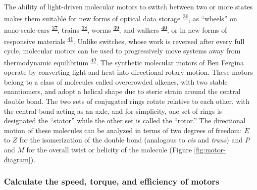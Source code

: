 \documentclass[11pt,notitlepage]{article}
\providecommand{\DIFaddbegin}{} %
\providecommand{\DIFaddend}{} %
\providecommand{\DIFdelbegin}{} %
\providecommand{\DIFdelend}{} %
\newcommand{\DIFscaledelfig}{0.5}
\newlength{\DIFdelgraphicswidth} %
\newlength{\DIFdelgraphicsheight} %
\newcommand{\DIFaddincludegraphics}[2][]{{\color{blue}\fbox{\DIFOincludegraphics[#1]{#2}}}} %
\newcommand{\DIFdelincludegraphics}[2][]{%
\sbox{\DIFdelgraphicsbox}{\DIFOincludegraphics[#1]{#2}}%
\settoboxwidth{\DIFdelgraphicswidth}{\DIFdelgraphicsbox} %
\settoboxtotalheight{\DIFdelgraphicsheight}{\DIFdelgraphicsbox} %
\scalebox{\DIFscaledelfig}{%
\parbox[b]{\DIFdelgraphicswidth}{\usebox{\DIFdelgraphicsbox}\\[-\baselineskip] \rule{\DIFdelgraphicswidth}{0em}}\llap{\resizebox{\DIFdelgraphicswidth}{\DIFdelgraphicsheight}{%
\setlength{\unitlength}{\DIFdelgraphicswidth}%
\begin{picture}(1,1)%
\thicklines\linethickness{2pt} %
{\color[rgb]{1,0,0}\put(0,0){\framebox(1,1){}}}%
{\color[rgb]{1,0,0}\put(0,0){\line( 1,1){1}}}%
{\color[rgb]{1,0,0}\put(0,1){\line(1,-1){1}}}%
\end{picture}%
}\hspace*{3pt}}} %
} %
\DeclareRobustCommand{\DIFaddbegin}{\DIFOaddbegin \let\includegraphics\DIFaddincludegraphics} %
\DeclareRobustCommand{\DIFaddend}{\DIFOaddend \let\includegraphics\DIFOincludegraphics} %
\DeclareRobustCommand{\DIFdelbegin}{\DIFOdelbegin \let\includegraphics\DIFdelincludegraphics} %
\DeclareRobustCommand{\DIFdelend}{\DIFOaddend \let\includegraphics\DIFOincludegraphics} %
\begin{document}
The ability of light-driven molecular motors to switch between two or
more states makes them suitable for new forms of optical data
storage\textsuperscript{\protect\DIFdelbegin %
\DIFdelend \DIFaddbegin \hyperlink{ref-18PGyWtWV}{36}\DIFaddend }, as
``wheels'' on nano-scale
cars\textsuperscript{\protect\DIFdelbegin %
\DIFdelend \DIFaddbegin \hyperlink{ref-OAnfwOYX}{37}\DIFaddend },
trains\textsuperscript{\protect\DIFdelbegin %
\DIFdelend \DIFaddbegin \hyperlink{ref-10MPrT2Vf}{38}\DIFaddend },
worms\textsuperscript{\protect\DIFdelbegin %
\DIFdelend \DIFaddbegin \hyperlink{ref-Tels98bO}{39}\DIFaddend }, and
walkers\textsuperscript{\protect\DIFdelbegin %
\DIFdelend \DIFaddbegin \hyperlink{ref-SfUEsk0e}{40}\DIFaddend }, or in new
forms of responsive
materials\textsuperscript{\protect\DIFdelbegin %
\DIFdelend \DIFaddbegin \hyperlink{ref-jCuccJLJ}{41}\DIFaddend }. Unlike
switches, whose work is reversed after every full cycle, molecular
motors can be used to progressively move systems away from thermodynamic
equilibrium\textsuperscript{\protect\DIFdelbegin %
\DIFdelend \DIFaddbegin \hyperlink{ref-1H5r7SBir}{42}\DIFaddend }. The
synthetic molecular motors of Ben Fergina operate by converting light
and heat into directional rotary motion. These motors belong to a class
of molecules called overcrowded alkenes, with two stable enantiomers,
and adopt a helical shape due to steric strain around the central double
bond. The two sets of conjugated rings rotate relative to each other,
with the central bond acting as an axle, and for simplicity, one set of
rings is designated the ``stator'' while the other set is called the
``rotor.'' The directional motion of these molecules can be analyzed in
terms of two degrees of freedom: \(E\) to \(Z\) for the isomerization of
the double bond (analogous to \emph{cis} and \emph{trans}) and \(P\) and
\(M\) for the overall twist or helicity of the molecule (Figure
\ref{fig:motor-diagram}).

\hypertarget{calculate-the-speed-torque-and-efficiency-of-motors}{%
\subsubsection{Calculate the speed, torque, and efficiency of
motors}\label{calculate-the-speed-torque-and-efficiency-of-motors}}
\end{document}
